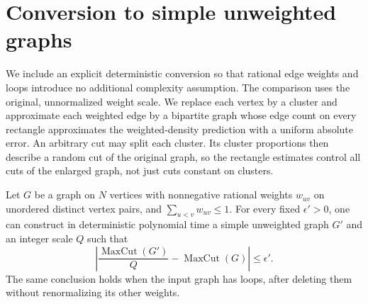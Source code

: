 \section{Conversion to simple unweighted graphs}\label{sec:unweighted}

We include an explicit deterministic conversion so that rational edge
weights and loops introduce no additional complexity assumption. The
comparison uses the original, unnormalized weight scale.
We replace each vertex by a cluster and approximate each weighted edge
by a bipartite graph whose edge count on every rectangle approximates the
weighted-density prediction with a uniform absolute error.
An arbitrary cut may split each cluster. Its cluster proportions then
describe a random cut of the original graph, so the rectangle estimates
control all cuts of the enlarged graph, not just cuts constant on clusters.

\begin{lemma}\label{lem:unweighted}
Let $G$ be a graph on $N$ vertices with nonnegative rational weights
$w_{uv}$ on unordered distinct vertex pairs, and
$\sum_{u<v}w_{uv}\le1$. For every fixed $\epsilon'>0$, one can construct
in deterministic polynomial time a simple unweighted graph $G'$ and an
integer scale $Q$ such that
\[
 \left|\frac{\operatorname{MaxCut}(G')}{Q}
             -\operatorname{MaxCut}(G)\right|\le\epsilon'.
\]
The same conclusion holds when the input graph has loops, after deleting
them without renormalizing its other weights.
\end{lemma}


